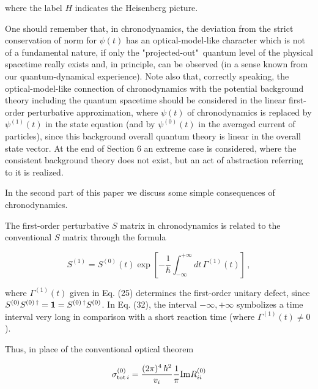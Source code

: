 \documentclass[a4paper,12pt]{article}
\begin{document}
\ni where the label $H$ indicates the Heisenberg picture.

One should remember that, in chronodynamics, the deviation from the strict conser\-vation of norm for $\psi(t)$ has an optical-model-like character which is not of a fundamental nature, if only the "projected-out"~quantum level of the physical spacetime really exists and, in principle, can be observed (in a sense known from our quantum-dynamical experience). Note also that, correctly speaking, the optical-model-like connection of chronodynamics with the potential background theory including the quantum spacetime should be considered in the linear first-order perturbative approximation, where $\psi(t)$ of chronodynamics is replaced by $\psi^{(1)}(t)$ in the state equation (and by $\psi^{(0)}(t)$ in the averaged current of particles), since this background overall quantum theory is linear in the overall state vector. At the end of Section 6 an extreme case is considered, where the consistent background theory does not exist, but an act of abstraction referring to it is realized.

In the second part of this paper we discuss some simple consequences of chronodynamics.

\vspace{0.25cm}


\vspace{0.25cm}

The first-order perturbative $S$ matrix in chronodynamics is related to the conventional $S$ matrix through the formula

\begin{equation}
S^{(1)} = S^{(0)}(t) \exp \left[-\frac{1}{\hbar} \int^{+\infty}_{-\infty} dt\, \Gamma^{(1)}(t) \right]\,,
\end{equation}

\ni where $\Gamma^{(1)}(t)$ given in Eq. (25) determines the first-order unitary defect, since $S^{(0)} S^{(0)\,\dagger} = {\bf 1} = S^{(0)\,\dagger} S^{(0)}$. In Eq. (32), the interval $-\infty,+\infty$ symbolizes a time interval  very long in comparison with a short reaction time (where $\Gamma^{(1)}(t) \neq 0$).

Thus, in place of the conventional optical theorem

\begin{equation}
\sigma^{(0)}_{{\rm tot}\,i} = \frac{(2\pi)^4\,\hbar^2}{v_i} \frac{1}{\pi} {\rm Im} R^{(0)}_{ii}
\end{equation}
\end{document}
